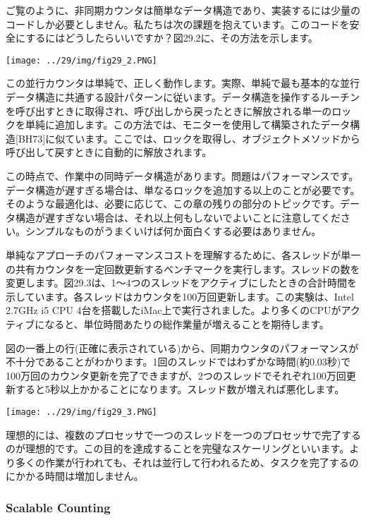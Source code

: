 ご覧のように、非同期カウンタは簡単なデータ構造であり、実装するには少量のコードしか必要としません。私たちは次の課題を抱えています。このコードを安全にするにはどうしたらいいですか？図29.2に、その方法を示します。

\texttt{[image: ../29/img/fig29\_2.PNG]}

この並行カウンタは単純で、正しく動作します。実際、単純で最も基本的な並行データ構造に共通する設計パターンに従います。データ構造を操作するルーチンを呼び出すときに取得され、呼び出しから戻ったときに解放される単一のロックを単純に追加します。この方法では、モニターを使用して構築されたデータ構造{[}BH73{]}に似ています。ここでは、ロックを取得し、オブジェクトメソッドから呼び出して戻すときに自動的に解放されます。

この時点で、作業中の同時データ構造があります。問題はパフォーマンスです。データ構造が遅すぎる場合は、単なるロックを追加する以上のことが必要です。そのような最適化は、必要に応じて、この章の残りの部分のトピックです。データ構造が遅すぎない場合は、それ以上何もしないでよいことに注意してください。シンプルなものがうまくいけば何か面白くする必要はありません。

単純なアプローチのパフォーマンスコストを理解するために、各スレッドが単一の共有カウンタを一定回数更新するベンチマークを実行します。スレッドの数を変更します。図29.3は、1〜4つのスレッドをアクティブにしたときの合計時間を示しています。各スレッドはカウンタを100万回更新します。この実験は、Intel
2.7GHz i5 CPU
4台を搭載したiMac上で実行されました。より多くのCPUがアクティブになると、単位時間あたりの総作業量が増えることを期待します。

図の一番上の行(正確に表示されている)から、同期カウンタのパフォーマンスが不十分であることがわかります。1回のスレッドではわずかな時間(約0.03秒)で100万回のカウンタ更新を完了できますが、2つのスレッドでそれぞれ100万回更新すると5秒以上かかることになります。スレッド数が増えれば悪化します。

\texttt{[image: ../29/img/fig29\_3.PNG]}

理想的には、複数のプロセッサで一つのスレッドを一つのプロセッサで完了するのが理想的です。この目的を達成することを完璧なスケーリングといいます。より多くの作業が行われても、それは並行して行われるため、タスクを完了するのにかかる時間は増加しません。

\hypertarget{scalable-counting}{%
\subsubsection*{Scalable Counting}\label{scalable-counting}}

